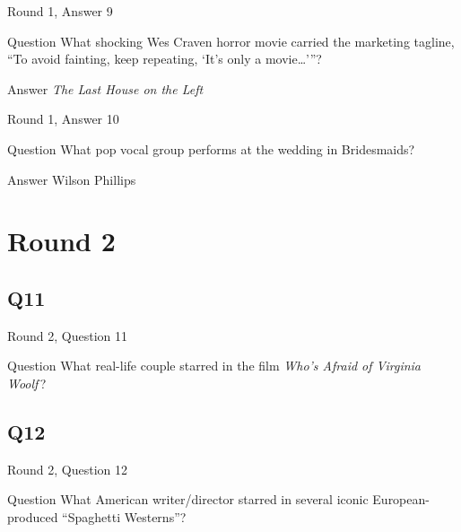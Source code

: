 \documentclass[11pt]{beamer}
\begin{document}
\begin{frame}[t]{Round 1, Answer 9}
\vspace{2em}
\begin{block}{Question}
What shocking Wes Craven horror movie carried the marketing tagline, ``To avoid fainting, keep repeating, `It's only a movie…'{}''?
\end{block}
\pause{}
\begin{block}{Answer}
\emph{The Last House on the Left}
\end{block}
\end{frame}
    

\begin{frame}[t]{Round 1, Answer 10}
\vspace{2em}
\begin{block}{Question}
What pop vocal group performs at the wedding in Bridesmaids?
\end{block}
\pause{}
\begin{block}{Answer}
Wilson Phillips
\end{block}
\end{frame}
    

\section{Round 2}
    

\subsection*{Q11}
\begin{frame}[t]{Round 2, Question 11}
\vspace{2em}
\begin{block}{Question}
What real-life couple starred in the film \emph{Who's Afraid of Virginia Woolf}\,?
\end{block}
\end{frame}
    

\subsection*{Q12}
\begin{frame}[t]{Round 2, Question 12}
\vspace{2em}
\begin{block}{Question}
What American writer/director starred in several iconic European-produced ``Spaghetti Westerns''?
\end{block}
\end{frame}
    
\end{document}
